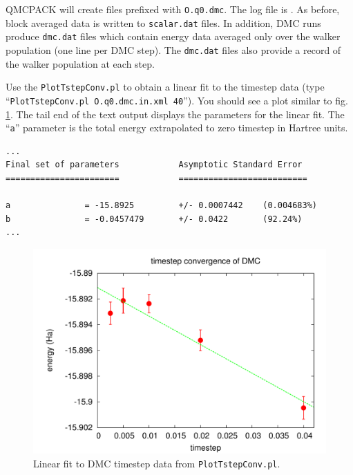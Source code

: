 QMCPACK will create files prefixed with \texttt{O.q0.dmc}.  The log file is .  As before, block averaged data is written to \texttt{scalar.dat} files.  In addition, DMC runs produce \texttt{dmc.dat} files which contain energy data averaged only over the walker population (one line per DMC step).  The \texttt{dmc.dat} files also provide a record of the walker population at each step.

Use the \texttt{PlotTstepConv.pl} to obtain a linear fit to the timestep data (type ``\texttt{PlotTstepConv.pl O.q0.dmc.in.xml 40}'').  You should see a plot similar to fig. \ref{fig:timestep_conv}.  The tail end of the text output displays the parameters for the linear fit.  The ``\texttt{a}'' parameter is the total energy extrapolated to zero timestep in Hartree units. 

\begin{shaded}
\begin{verbatim}
...
Final set of parameters            Asymptotic Standard Error
=======================            ==========================

a               = -15.8925         +/- 0.0007442    (0.004683%)
b               = -0.0457479       +/- 0.0422       (92.24%)
...
\end{verbatim}
\end{shaded}

\begin{figure}
\begin{center}
\includegraphics[trim = 0mm 0mm 0mm 0mm, clip,width=0.75\columnwidth]{./figures/lab_qmc_basics_timestep_conv}
\end{center}
\caption{Linear fit to DMC timestep data from \texttt{PlotTstepConv.pl}.
\label{fig:timestep_conv}
}
\end{figure}


